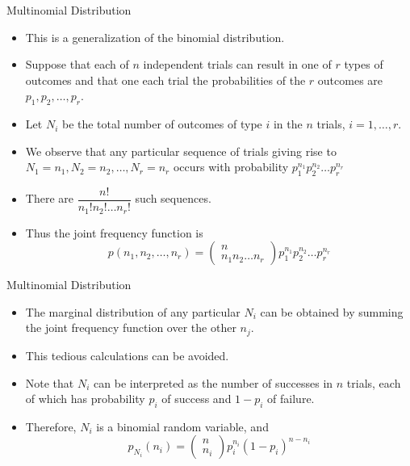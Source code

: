 \documentclass{beamer}
\begin{document}
\begin{frame}{Multinomial Distribution}

    \begin{itemize}
        \item This is a generalization of the binomial distribution. \\ \pause
    \item Suppose that each of \(n\) independent trials can result in one of \(r\) types of outcomes and that one each trial the probabilities of the \(r\) outcomes are \(p_1,p_2, \dots, p_r\). \\ \pause
     \item Let \(N_i\) be the total number of outcomes of type \(i\) in the \(n\) trials, \(i=1, \dots, r\). \\ \pause

    \item We observe that any particular sequence of trials giving rise to \(N_1=n_1, N_2=n_2, \dots, N_r=n_r\) occurs with probability \(p_1^{n_1} p_2^{n_2}\dots p_r^{n_r}\)\\ \pause

    \item There are \(\dfrac{n!}{n_1!n_2!\dots n_r!}\) such sequences. \\ \pause

    \item Thus the joint frequency function is \[p(n_1,n_2,\dots,n_r)= \begin{pmatrix}
        n \\
        n_1n_2\dots n_r
    \end{pmatrix} p_1^{n_1}p_2^{n_2}\dots p_r^{n_r}\]
\end{itemize}
\end{frame}

\begin{frame}{Multinomial Distribution}

\begin{itemize}

    \item The marginal distribution of any particular \(N_i\) can be obtained by summing the joint frequency function over the other \(n_j\). \\ \pause
    \item This tedious calculations can be avoided. \\ \pause
    \item Note that \(N_i\) can be interpreted as the number of successes in \(n\) trials, each of which has probability \(p_i\) of success and \(1-p_i\) of failure. 
    \item Therefore, \(N_i\) is a binomial random variable, and \[p_{N_i}(n_i)=\begin{pmatrix}
        n\\
        n_i
    \end{pmatrix} p_i^{n_i}(1-p_i)^{n-n_i}\]
    
\end{itemize}
\end{frame}
\end{document}
